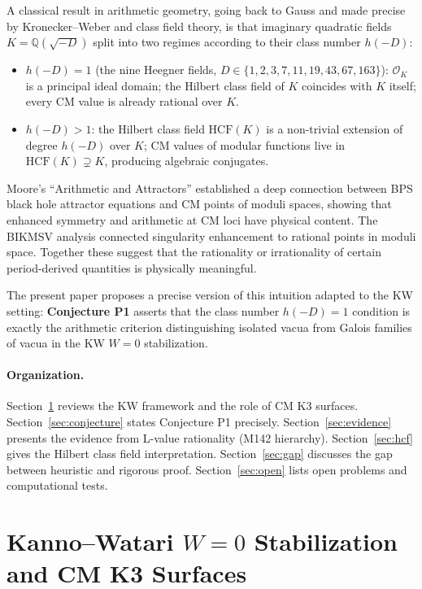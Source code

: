 \documentclass[12pt,a4paper]{article}
\theoremstyle{plain}
\theoremstyle{definition}
\newcommand{\Q}{\mathbb{Q}}
\newcommand{\OK}{\mathcal{O}_K}
\newcommand{\HCF}{\mathrm{HCF}}
\begin{document}
A classical result in arithmetic geometry, going back to Gauss and made
precise by Kronecker--Weber and class field theory, is that imaginary
quadratic fields $K = \Q(\sqrt{-D})$ split into two regimes according to
their class number $h(-D)$:
\begin{itemize}
  \item $h(-D) = 1$ (the nine Heegner fields, $D \in \{1, 2, 3, 7, 11,
    19, 43, 67, 163\}$): $\OK$ is a principal ideal domain; the Hilbert
    class field of $K$ coincides with $K$ itself; every CM value is
    already rational over $K$.
  \item $h(-D) > 1$: the Hilbert class field $\HCF(K)$ is a non-trivial
    extension of degree $h(-D)$ over $K$; CM values of modular functions
    live in $\HCF(K) \supsetneq K$, producing algebraic conjugates.
\end{itemize}

Moore's ``Arithmetic and Attractors'' \cite{Moore1998} established a deep
connection between BPS black hole attractor equations and CM points of
moduli spaces, showing that enhanced symmetry and arithmetic at CM loci
have physical content. The BIKMSV analysis \cite{BIKMSV1996} connected
singularity enhancement to rational points in moduli space. Together these
suggest that the rationality or irrationality of certain period-derived
quantities is physically meaningful.

The present paper proposes a precise version of this intuition adapted to
the KW setting: \textbf{Conjecture P1} asserts that the class number $h(-D)=1$
condition is exactly the arithmetic criterion distinguishing isolated vacua
from Galois families of vacua in the KW $W=0$ stabilization.

\paragraph{Organization.}
Section~\ref{sec:kw} reviews the KW framework and the role of CM K3 surfaces.
Section~\ref{sec:conjecture} states Conjecture P1 precisely.
Section~\ref{sec:evidence} presents the evidence from L-value rationality
(M142 hierarchy).
Section~\ref{sec:hcf} gives the Hilbert class field interpretation.
Section~\ref{sec:gap} discusses the gap between heuristic and rigorous proof.
Section~\ref{sec:open} lists open problems and computational tests.

\section{Kanno--Watari $W=0$ Stabilization and CM K3 Surfaces}
\label{sec:kw}
\end{document}

